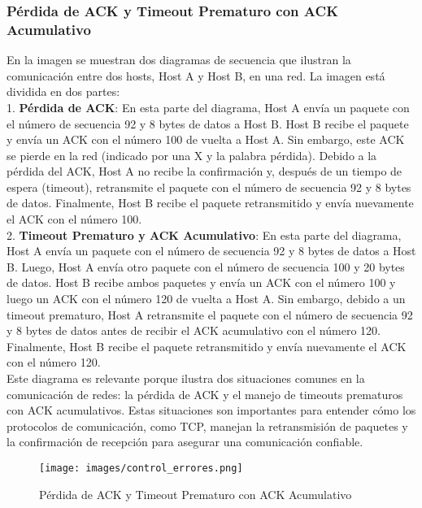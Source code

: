 \documentclass[a4paper,12pt]{article}
\begin{document}
\subsubsection{Pérdida de ACK y Timeout Prematuro con ACK Acumulativo}

En la imagen se muestran dos diagramas de secuencia que ilustran la comunicación entre dos hosts, Host A y Host B, en una red. La imagen está dividida en dos partes:\\

1. \textbf{Pérdida de ACK}: En esta parte del diagrama, Host A envía un paquete con el número de secuencia 92 y 8 bytes de datos a Host B. Host B recibe el paquete y envía un ACK con el número 100 de vuelta a Host A. Sin embargo, este ACK se pierde en la red (indicado por una X y la palabra pérdida). Debido a la pérdida del ACK, Host A no recibe la confirmación y, después de un tiempo de espera (timeout), retransmite el paquete con el número de secuencia 92 y 8 bytes de datos. Finalmente, Host B recibe el paquete retransmitido y envía nuevamente el ACK con el número 100.\\

2. \textbf{Timeout Prematuro y ACK Acumulativo}: En esta parte del diagrama, Host A envía un paquete con el número de secuencia 92 y 8 bytes de datos a Host B. Luego, Host A envía otro paquete con el número de secuencia 100 y 20 bytes de datos. Host B recibe ambos paquetes y envía un ACK con el número 100 y luego un ACK con el número 120 de vuelta a Host A. Sin embargo, debido a un timeout prematuro, Host A retransmite el paquete con el número de secuencia 92 y 8 bytes de datos antes de recibir el ACK acumulativo con el número 120. Finalmente, Host B recibe el paquete retransmitido y envía nuevamente el ACK con el número 120.\\

Este diagrama es relevante porque ilustra dos situaciones comunes en la comunicación de redes: la pérdida de ACK y el manejo de timeouts prematuros con ACK acumulativos. Estas situaciones son importantes para entender cómo los protocolos de comunicación, como TCP, manejan la retransmisión de paquetes y la confirmación de recepción para asegurar una comunicación confiable.\\

\begin{figure}[H]
    \centering
    \texttt{[image: images/control\_errores.png]}
    \caption{Pérdida de ACK y Timeout Prematuro con ACK Acumulativo}
    \label{fig:ack_timeout}
\end{figure}
\end{document}
